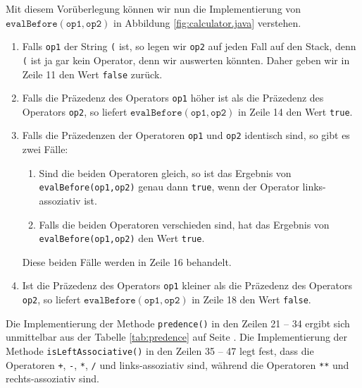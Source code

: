 Mit diesem Vor\"uberlegung k\"onnen wir nun die Implementierung von
$\texttt{evalBefore}(\mathtt{op1},\mathtt{op2})$ in  Abbildung \ref{fig:calculator.java}  verstehen.
\begin{enumerate}
\item Falls \texttt{op1} der String \texttt{(} ist, so legen wir
      \texttt{op2} auf jeden Fall auf den Stack, denn \texttt{(}
      ist ja gar kein Operator, denn wir auswerten k\"onnten.
      Daher geben wir in Zeile 11 den Wert \texttt{false} zur\"uck.
\item Falls die Pr\"azedenz des Operators \texttt{op1} h\"oher ist als die Pr\"azedenz des
      Operators \texttt{op2}, so liefert $\texttt{evalBefore}(\mathtt{op1},\mathtt{op2})$
      in Zeile 14 den Wert \texttt{true}.
\item Falls die Pr\"azedenzen der Operatoren \texttt{op1} und \texttt{op2} identisch sind,
      so gibt es zwei F\"alle:
      \begin{enumerate}
      \item Sind die beiden Operatoren gleich, so ist das Ergebnis von
            \texttt{evalBefore(op1,op2)} genau dann \texttt{true}, wenn der Operator
            links-assoziativ ist.
      \item Falls die beiden Operatoren verschieden sind, hat das Ergebnis von
            \texttt{evalBefore(op1,op2)} den Wert \texttt{true}. 
      \end{enumerate}
      Diese beiden F\"alle werden in Zeile 16 behandelt.
\item Ist die Pr\"azedenz  des Operators \texttt{op1} kleiner als die Pr\"azedenz des
      Operators \texttt{op2}, so liefert $\texttt{evalBefore}(\mathtt{op1},\mathtt{op2})$
      in Zeile 18 den Wert \texttt{false}.
\end{enumerate}
Die Implementierung der Methode \texttt{predence()} in den Zeilen 21 -- 34 ergibt sich
unmittelbar aus der Tabelle \ref{tab:predence} auf Seite \pageref{tab:predence}.
Die Implementierung der Methode \texttt{isLeftAssociative()} in den Zeilen 35 -- 47
legt fest, dass die Operatoren \texttt{+},
\texttt{-}, \texttt{*},
\texttt{/} und 
\texttt{} links-assoziativ sind, w\"ahrend die Operatoren
\texttt{**} und \texttt{}
rechts-assoziativ sind.

